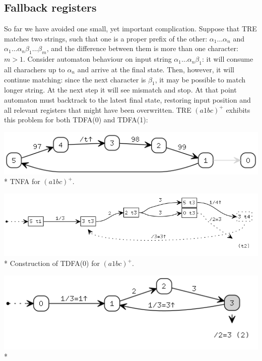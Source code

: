 \documentclass{article}
\theoremstyle{definition}
\begin{document}
\begin{multicols}{2}
\subsection*{Fallback registers}

So far we have avoided one small, yet important complication.
Suppose that TRE matches two strings, such that one is a proper prefix of the other:
$\alpha_1 \dots \alpha_n$ and $\alpha_1 \dots \alpha_n \beta_1 \dots \beta_m$,
and the difference between them is more than one character: $m \!>\! 1$.
Consider automaton behaviour on input string $\alpha_1 \dots \alpha_n \beta_1$:
it will consume all charachers up to $\alpha_n$ and arrive at the final state.
Then, however, it will continue matching: since the next character is $\beta_1$, it may be possible to match longer string.
At the next step it will see mismatch and stop.
At that point automaton must backtrack to the latest final state,
restoring input position and all relevant registers that might have been overwritten.
TRE $(a 1 bc)^+$ exhibits this problem for both TDFA(0) and TDFA(1):
\begin{center}
\includegraphics[width=0.8\linewidth]{img/fallback/tnfa.png}\\*
\footnotesize{TNFA for $(a 1 bc)^+$.} \\
\end{center}
\begin{center}
\includegraphics[width=\linewidth]{img/fallback/tdfa0_raw.png}\\*
\footnotesize{Construction of TDFA(0) for $(a 1 bc)^+$.} \\
\end{center}
\begin{center}
\includegraphics[width=0.8\linewidth]{img/fallback/tdfa0.png}\\*

\end{center}
\end{multicols}
\end{document}
